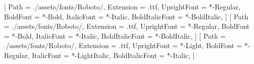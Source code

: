 \setmainfont{Roboto}[
    Path = ./assets/fonts/Roboto/,
    Extension = .ttf,
    UprightFont = *-Regular,
    BoldFont = *-Bold,
    ItalicFont = *-Italic,
    BoldItalicFont = *-BoldItalic,
]
[
    Path = ./assets/fonts/Roboto/,
    Extension = .ttf,
    UprightFont = *-Regular,
    BoldFont = *-Bold,
    ItalicFont = *-Italic,
    BoldItalicFont = *-BoldItalic,
]
[
    Path = ./assets/fonts/Roboto/,
    Extension = .ttf,
    UprightFont = *-Light,
    BoldFont = *-Regular,
    ItalicFont = *-LightItalic,
    BoldItalicFont = *-Italic,
]

